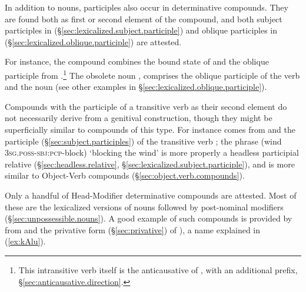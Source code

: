 In addition to nouns, participles also occur in determinative compounds. They are found both as first or second element of the compound, and both subject participles in  (§\ref{sec:lexicalized.subject.participle}) and oblique participles in  (§\ref{sec:lexicalized.oblique.participle}) are attested.

For instance, the compound  combines the bound state of  and the oblique participle  from .\footnote{This intransitive verb itself is the anticausative of , with an additional  prefix, §\ref{sec:anticausative.direction}. } The obsolete noun , comprises the oblique participle  of the verb  and the noun  (see other examples in §\ref{sec:lexicalized.oblique.participle}).

Compounds with the participle of a transitive verb as their second element do not necessarily derive from a genitival construction, though they might be superficially similar to compounds of this type. For instance  comes from  and the participle  (§\ref{sec:subject.participles}) of the transitive verb ; the phrase  (wind \textsc{3sg}.\textsc{poss}-\textsc{sbj}:\textsc{pcp}-block) `blocking the wind' is more properly a headless participial relative (§\ref{sec:headless.relative}, §\ref{sec:lexicalized.subject.participle}), and is more similar to Object-Verb compounds (§\ref{sec:object.verb.compounds}).

Only a handful of Head-Modifier determinative compounds are attested. Most of these are the lexicalized versions of nouns followed by post-nominal modifiers (§\ref{sec:unpossessible.nouns}). A good example of such compounds is provided by  from  and the privative form  (§\ref{sec:privative}) of ), a name explained in (\ref{ex:kAlu}). 


